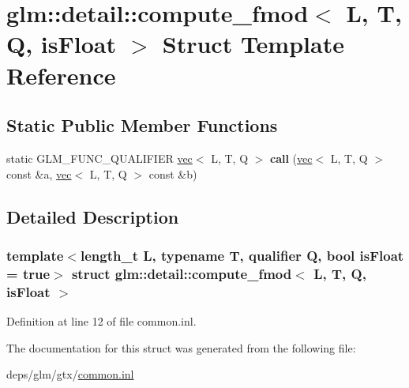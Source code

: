 \hypertarget{structglm_1_1detail_1_1compute__fmod}{}\section{glm\+:\+:detail\+:\+:compute\+\_\+fmod$<$ L, T, Q, is\+Float $>$ Struct Template Reference}
\label{structglm_1_1detail_1_1compute__fmod}
\subsection*{Static Public Member Functions}
\begin{DoxyCompactItemize}
\item 
\mbox{\label{structglm_1_1detail_1_1compute__fmod_ae35d975da6d39feaf1e370b3bf0245cb}} 
static G\+L\+M\+\_\+\+F\+U\+N\+C\+\_\+\+Q\+U\+A\+L\+I\+F\+I\+ER \hyperlink{structglm_1_1vec}{vec}$<$ L, T, Q $>$ {\bfseries call} (\hyperlink{structglm_1_1vec}{vec}$<$ L, T, Q $>$ const \&a, \hyperlink{structglm_1_1vec}{vec}$<$ L, T, Q $>$ const \&b)
\end{DoxyCompactItemize}


\subsection{Detailed Description}
\subsubsection*{template$<$length\+\_\+t L, typename T, qualifier Q, bool is\+Float = true$>$\newline
struct glm\+::detail\+::compute\+\_\+fmod$<$ L, T, Q, is\+Float $>$}



Definition at line 12 of file common.\+inl.



The documentation for this struct was generated from the following file\+:\begin{DoxyCompactItemize}
\item 
deps/glm/gtx/\hyperlink{common_8inl}{common.\+inl}\end{DoxyCompactItemize}
